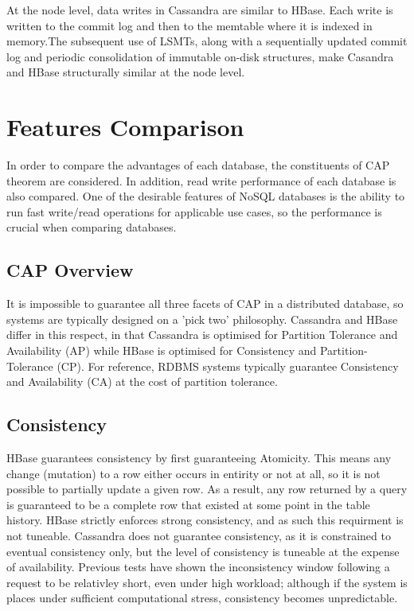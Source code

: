 \documentclass[10pt]{article}
\begin{document}
At the node level, data writes in Cassandra are similar to HBase. Each write is written to the commit log and then to the memtable where it is indexed in memory.The subsequent use of LSMTs, along with a sequentially updated commit log and periodic consolidation of immutable on-disk structures, make Casandra and HBase structurally similar at the node level.

\section{Features Comparison}
In order to compare the advantages of each database, the constituents of CAP theorem are considered.
In addition, read write performance of each database is also compared. One of the desirable features of NoSQL databases is the ability to run fast write/read operations for applicable use cases, so the performance is crucial when comparing databases.

\subsection{CAP Overview}
It is impossible to guarantee all three facets of CAP in a distributed database, so systems are typically designed on a 'pick two' philosophy. Cassandra and HBase differ in this respect, in that Cassandra is optimised for Partition Tolerance and Availability (AP) while HBase is optimised for Consistency and Partition-Tolerance (CP). For reference, RDBMS systems typically guarantee Consistency and Availability (CA) at the cost of partition tolerance.

\subsection{Consistency}
HBase guarantees consistency by first guaranteeing Atomicity. This means any change (mutation) to a row either occurs in entirity or not at all, so it is not possible to partially update a given row. As a result, any row returned by a query is guaranteed to be a complete row that existed at some point in the table history. HBase strictly enforces strong consistency, and as such this requirment is not tuneable. Cassandra does not guarantee consistency, as it is constrained to eventual consistency only, but the level of consistency is tuneable at the expense of availability. Previous tests have shown the inconsistency window following a request to be relativley short, even under high workload; although if the system is places under sufficient computational stress, consistency becomes unpredictable. \cite{10.1007/978-3-319-04936-6_3}
\end{document}
